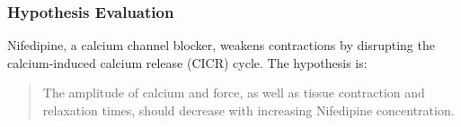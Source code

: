 \documentclass{report}
\begin{document}
        
    
            
        \subsubsection{Hypothesis Evaluation}
            Nifedipine, a calcium channel blocker, weakens contractions by disrupting the calcium-induced calcium release (CICR) cycle. The hypothesis is:
            \begin{quote}
                The amplitude of calcium and force, as well as tissue contraction and relaxation times, should decrease with increasing Nifedipine concentration.
            \end{quote}
            
\end{document}
